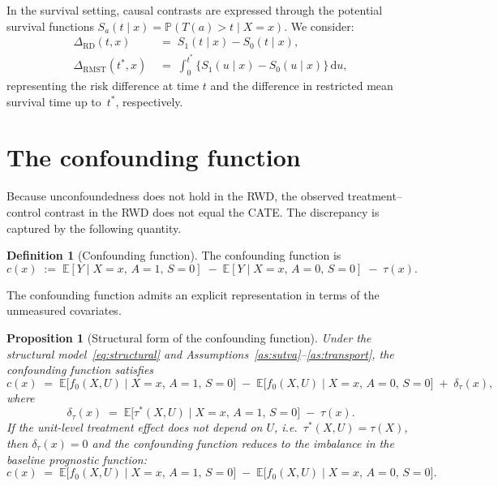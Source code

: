 \documentclass[10pt]{article}
\theoremstyle{plain}
\newtheorem{proposition}{Proposition}
\theoremstyle{definition}
\newtheorem{definition}{Definition}
\theoremstyle{remark}
\newcommand{\E}{\mathbb{E}}
\newcommand{\p}{\mathbb{P}}
\newcommand{\CATE}{\tau}
\newcommand{\cf}{c}
\begin{document}
\noindent In the survival setting, causal contrasts are expressed through the potential survival functions $S_a(t \mid x) = \p(T(a) > t \mid X = x)$. We consider:
\begin{align}
  \Delta_{\mathrm{RD}}(t, x) &\;=\; S_1(t \mid x) - S_0(t \mid x), \label{eq:rd} \\[4pt]
  \Delta_{\mathrm{RMST}}(t^*, x) &\;=\; \int_0^{t^*} \bigl\{S_1(u \mid x) - S_0(u \mid x)\bigr\}\,\mathrm{d}u, \label{eq:rmst}
\end{align}
representing the risk difference at time $t$ and the difference in restricted mean survival time up to~$t^*$, respectively.

\section{The confounding function}

Because unconfoundedness does not hold in the RWD, the observed treatment--control contrast in the RWD does not equal the CATE. The discrepancy is captured by the following quantity.

\begin{definition}[Confounding function]\label{def:cf}
  The confounding function is
  \begin{equation}\label{eq:cf}
    \cf(x) \;:=\; \E[Y \mid X = x,\, A = 1,\, S = 0] 
    \;-\; \E[Y \mid X = x,\, A = 0,\, S = 0] 
    \;-\; \CATE(x).
  \end{equation}
\end{definition}

\noindent The confounding function admits an explicit representation in terms of the unmeasured covariates.

\begin{proposition}[Structural form of the confounding function]\label{prop:cf_structural}
  Under the structural model~\eqref{eq:structural} and Assumptions~\ref{as:sutva}--\ref{as:transport}, the confounding function satisfies
  \begin{equation}\label{eq:cf_structural}
    \cf(x) \;=\; \E\bigl[f_0(X,U) \mid X = x,\, A=1,\, S=0\bigr]
    \;-\; \E\bigl[f_0(X,U) \mid X = x,\, A=0,\, S=0\bigr]
    \;+\; \delta_\tau(x),
  \end{equation}
  where
  \begin{equation}\label{eq:delta_tau}
    \delta_\tau(x) \;=\; \E\bigl[\CATE^*(X,U) \mid X=x,\, A=1,\, S=0\bigr] 
    \;-\; \CATE(x).
  \end{equation}
  If the unit-level treatment effect does not depend on $U$, i.e.\ $\CATE^*(X,U) = \CATE(X)$, then $\delta_\tau(x) = 0$ and the confounding function reduces to the imbalance in the baseline prognostic function:
  \begin{equation}\label{eq:cf_simple}
    \cf(x) \;=\; \E\bigl[f_0(X,U) \mid X = x,\, A=1,\, S=0\bigr]
    \;-\; \E\bigl[f_0(X,U) \mid X = x,\, A=0,\, S=0\bigr].
  \end{equation}
\end{proposition}
\end{document}
